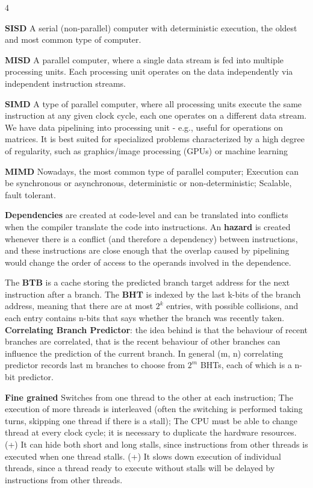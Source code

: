 \documentclass[a4paper,landscape]{article}
\begin{document}
\fontsize{13pt}{9.3pt}\selectfont

\begin{multicols}{4}


\noindent \textbf{SISD} A serial (non-parallel) computer with deterministic execution, the oldest and most common type of computer.


\noindent \textbf{MISD} A parallel computer, where a single data stream is fed into multiple processing units. Each processing unit operates on the data independently via independent instruction streams.


\noindent \textbf{SIMD} A type of parallel computer, where all processing units execute the same instruction at any given clock cycle, each one operates on a different data stream. We have data pipelining into processing unit - e.g., useful for operations on matrices. It is best suited for specialized problems characterized by a high degree of regularity, such as graphics/image processing (GPUs) or machine learning

\noindent \textbf{MIMD} Nowadays, the most common type of parallel computer; Execution can be synchronous or asynchronous, deterministic or non-deterministic; Scalable, fault tolerant.

\noindent \textbf{Dependencies} are created at code-level and can be translated into conflicts when the compiler translate the code into instructions. An \textbf{hazard} is created whenever there is a conflict (and therefore a dependency) between instructions, and these instructions are close enough that the overlap caused by pipelining would change the order of access to the operands involved in the dependence.

\noindent The \textbf{BTB} is a cache storing the predicted branch target address for the next instruction after a branch. The \textbf{BHT} is indexed by the last k-bits of the branch address, meaning that there are at most $2^k$ entries, with possible collisions, and each entry contains n-bits that says whether the branch was recently taken. \textbf{Correlating Branch Predictor}: the idea behind is that the behaviour of recent branches are correlated, that is the recent behaviour of other branches can influence the prediction of the current branch. In general (m, n) correlating predictor records last m branches to choose from $2^m$ BHTs, each of which is a n-bit predictor.

\noindent \textbf{Fine grained} Switches from one thread to the other at each instruction; The execution of more threads is interleaved (often the switching is performed taking turns, skipping one thread if there is a stall); The CPU must be able to change thread at every clock cycle; it is necessary to duplicate the hardware resources. (+) It can hide both short and long stalls, since instructions from other threads is executed when one thread stalls. (+) It slows down execution of individual threads, since a thread ready to execute without stalls will be delayed by instructions from other threads.



\end{multicols}
\end{document}
